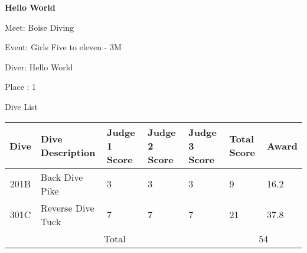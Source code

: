 \documentclass[12pt, letterpaper, landscape]{article}
\begin{document}
	\begin{center}
		\textbf{Hello World}
	\end{center}
	
	Meet: Boise Diving

	Event: Girls Five to eleven - 3M
	
	Diver: Hello World
	
	Place : 1
	
	\begin{center}
		Dive List
	\end{center}
	
	\begin{table}[h]
		\centering
			\begin{tabularx}{\textwidth}{|c X X X X X X|}
			Dive&Dive Description&Judge 1 Score&Judge 2 Score&Judge 3 Score&Total Score & Award\\\midrule
			201B&Back Dive Pike&3&3&3&9&16.2\\\midrule
301C&Reverse Dive Tuck&7&7&7&21&37.8\\\midrule
\midrule
			\multicolumn{5}{|c}{Total} & \multicolumn{2}{c|}{54}\\
		\end{tabularx}
	\end{table}
\end{document}
